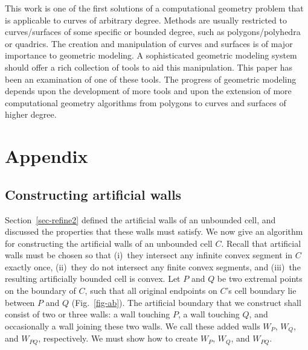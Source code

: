 This work is one of the first solutions
of a computational geometry problem that is applicable to curves of 
arbitrary degree.
Methods are usually restricted to curves/surfaces of some specific or 
bounded degree, such as polygons/polyhedra or quadrics.
The creation and manipulation of curves and surfaces is of major importance 
to geometric modeling.
A sophisticated geometric modeling system should offer 
a rich collection of tools to aid this manipulation.
This paper has been an examination of one of these tools.
The progress of geometric modeling depends upon the development of more 
tools and upon 
the extension of more computational geometry algorithms from polygons to 
curves and 
surfaces of higher degree.

\section{Appendix}
\label{sec-append}
\subsection{Constructing artificial walls}
\label{sec-caa}
Section~\ref{sec-refine2} defined the artificial walls of an unbounded cell,
and discussed the properties that these walls must satisfy.
We now give an algorithm for constructing the artificial walls of 
an unbounded
cell $C$.
Recall that artificial walls must be chosen so that 
(i)~they intersect any infinite convex segment in $C$ exactly once,
(ii)~they do not intersect any finite convex segments, and
(iii)~the resulting artificially bounded cell is convex.
Let $P$ and $Q$ be two extremal points on the boundary of $C$, 
such that all original endpoints
on $C$'s cell boundary lie between $P$ and $Q$ (Fig.~\ref{fig-ab}).
The artificial boundary that we construct shall consist of two or 
three walls:
a wall touching $P$, a wall touching $Q$, and occasionally a wall joining 
these two walls.
We call these added walls $W_{P}$, $W_{Q}$, and $W_{PQ}$, respectively.
We must show how to create $W_{P}$, $W_{Q}$, and $W_{PQ}$.

